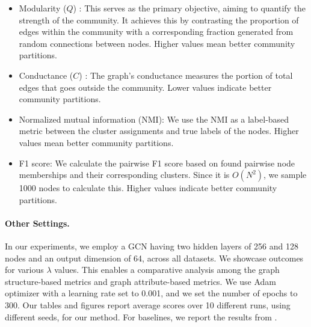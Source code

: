 \begin{itemize}
    \item Modularity ($Q$) \cite{newman2006modularity}: This serves as the primary objective, aiming to quantify the strength of the community. It achieves this by contrasting the proportion of edges within the community with a corresponding fraction generated from random connections between nodes. Higher values mean better community partitions.
    \item Conductance ($C$) \cite{yang2012defining}: The graph's conductance measures the portion of total edges that goes outside the community. Lower values indicate better community partitions.
    \item Normalized mutual information (NMI): We use the NMI as a label-based metric between the cluster assignments and true labels of the nodes. Higher values mean better community partitions.
    \item F1 score: We calculate the pairwise F1 score based on found pairwise node memberships and their corresponding clusters. Since it is $O(N^2)$, we sample 1000 nodes to calculate this. Higher values indicate better community partitions.
\end{itemize}

\paragraph{Other Settings.}

In our experiments, we employ a GCN having two hidden layers of 256 and 128 nodes and an output dimension of 64, across all datasets. We showcase outcomes for various $\lambda$ values. This enables a comparative analysis among the graph structure-based metrics and graph attribute-based metrics. We use Adam optimizer with a learning rate set to 0.001, and we set the number of epochs to 300. Our tables and figures report average scores over 10 different runs, using different seeds, for our method.
For baselines, we report the results from \citet{muller2023graph}. 




